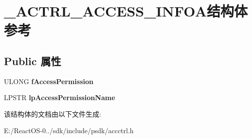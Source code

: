 \hypertarget{struct___a_c_t_r_l___a_c_c_e_s_s___i_n_f_o_a}{}\section{\+\_\+\+A\+C\+T\+R\+L\+\_\+\+A\+C\+C\+E\+S\+S\+\_\+\+I\+N\+F\+O\+A结构体 参考}
\label{struct___a_c_t_r_l___a_c_c_e_s_s___i_n_f_o_a}
\subsection*{Public 属性}
\begin{DoxyCompactItemize}
\item 
\mbox{\label{struct___a_c_t_r_l___a_c_c_e_s_s___i_n_f_o_a_ae2541536e09e4296791df3574c2a70e8}} 
U\+L\+O\+NG {\bfseries f\+Access\+Permission}
\item 
\mbox{\label{struct___a_c_t_r_l___a_c_c_e_s_s___i_n_f_o_a_a4a2624fc565db67b3ef8b8724aec457e}} 
L\+P\+S\+TR {\bfseries lp\+Access\+Permission\+Name}
\end{DoxyCompactItemize}


该结构体的文档由以下文件生成\+:\begin{DoxyCompactItemize}
\item 
E\+:/\+React\+O\+S-\/0../sdk/include/psdk/accctrl.\+h\end{DoxyCompactItemize}

